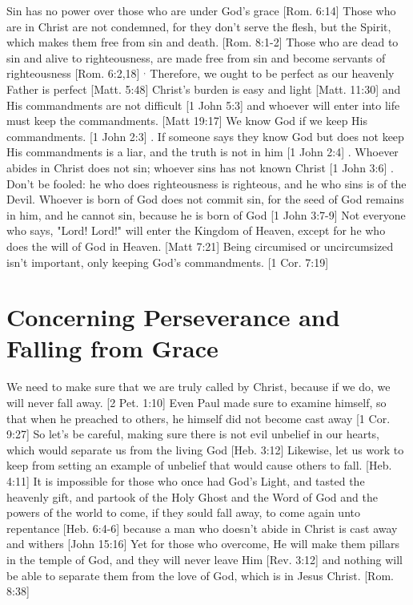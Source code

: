 \documentclass[../main.tex] {subfiles}
\begin{document}
	Sin has no power over those who are under God's grace [Rom. 6:14]  Those who are in Christ are not condemned, for they don't serve the flesh, but the Spirit, which makes them free from sin and death. [Rom. 8:1-2]  Those who are dead to sin and alive to righteousness, are made free from sin and become servants of righteousness [Rom. 6:2,18] $^{,}$ Therefore, we ought to be perfect as our heavenly Father is perfect [Matt. 5:48]  Christ's burden is easy and light [Matt. 11:30]  and His commandments are not difficult [1 John 5:3]  and whoever will enter into life must keep the commandments. [Matt 19:17]  We know God if we keep His commandments. [1 John 2:3] . If someone says they know God but does not keep His commandments is a liar, and the truth is not in him [1 John 2:4] . Whoever abides in Christ does not sin; whoever sins has not known Christ [1 John 3:6] . Don't be fooled: he who does righteousness is righteous, and he who sins is of the Devil. Whoever is born of God does not commit sin, for the seed of God remains in him, and he cannot sin, because he is born of God [1 John 3:7-9]  Not everyone who says, "Lord! Lord!" will enter the Kingdom of Heaven, except for he who does the will of God in Heaven. [Matt 7:21]  Being circumised or uncircumsized isn't important, only keeping God's commandments. [1 Cor. 7:19] 

	\section{Concerning Perseverance and Falling from Grace}

	We need to make sure that we are truly called by Christ, because if we do, we will never fall away. [2 Pet. 1:10]  Even Paul made sure to examine himself, so that when he preached to others, he himself did not become cast away [1 Cor. 9:27]  So let's be careful, making sure there is not evil unbelief in our hearts, which would separate us from the living God [Heb. 3:12]  Likewise, let us work to keep from setting an example of unbelief that would cause others to fall. [Heb. 4:11]  It is impossible for those who once had God's Light, and tasted the heavenly gift, and partook of the Holy Ghost and the Word of God and the powers of the world to come, if they sould fall away, to come again unto repentance [Heb. 6:4-6]  because a man who doesn't abide in Christ is cast away and withers [John 15:16]  Yet for those who overcome, He will make them pillars in the temple of God, and they will never leave Him [Rev. 3:12]  and nothing will be able to separate them from the love of God, which is in Jesus Christ. [Rom. 8:38] 
\end{document}
